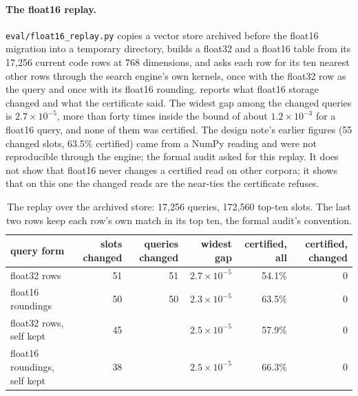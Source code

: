 \documentclass[11pt]{article}
\theoremstyle{plain}
\theoremstyle{definition}
\theoremstyle{remark}
\begin{document}
\paragraph{The float16 replay.} \texttt{eval/float16\_replay.py} copies a vector store archived
before the float16 migration into a temporary directory, builds a float32 and a float16 table from
its 17,256 current code rows at 768 dimensions, and asks each row for its ten nearest other rows
through the search engine's own kernels, once with the float32 row as the query and once with its
float16 rounding.  reports what float16 storage changed and what the certificate
said. The widest gap among the changed queries is $2.7\times 10^{-5}$, more than forty times
inside the bound of about $1.2\times 10^{-3}$ for a float16 query, and none of them was certified.
The design note's earlier figures (55 changed slots, 63.5\% certified) came from a NumPy reading
and were not reproducible through the engine; the formal audit asked for this replay. It does not
show that float16 never changes a certified read on other corpora; it shows that on this one the
changed reads are the near-ties the certificate refuses.

\begin{table}[htbp]
\centering\footnotesize
\caption{The replay over the archived store: 17,256 queries, 172,560 top-ten slots. The last two
rows keep each row's own match in its top ten, the formal audit's convention.}\label{tab:replay}
\begin{tabular}{lrrrrr}
\toprule
query form & slots changed & queries changed & widest gap & certified, all & certified, changed \\
\midrule
float32 rows & 51 & 51 & $2.7\times 10^{-5}$ & 54.1\% & 0 \\
float16 roundings & 50 & 50 & $2.3\times 10^{-5}$ & 63.5\% & 0 \\
\midrule
float32 rows, self kept & 45 & & $2.5\times 10^{-5}$ & 57.9\% & 0 \\
float16 roundings, self kept & 38 & & $2.5\times 10^{-5}$ & 66.3\% & 0 \\
\bottomrule
\end{tabular}
\end{table}
\end{document}
